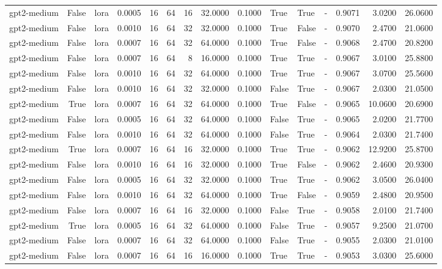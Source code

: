 \begin{tabular}{lrlrrrrrrlllrrr}
gpt2-medium & False & lora & 0.0005 & 16 & 64 & 16 & 32.0000 & 0.1000 & True & True & - & 0.9071 & 3.0200 & 26.0600 \\
gpt2-medium & False & lora & 0.0010 & 16 & 64 & 32 & 32.0000 & 0.1000 & True & False & - & 0.9070 & 2.4700 & 21.0600 \\
gpt2-medium & False & lora & 0.0007 & 16 & 64 & 32 & 64.0000 & 0.1000 & True & False & - & 0.9068 & 2.4700 & 20.8200 \\
gpt2-medium & False & lora & 0.0007 & 16 & 64 & 8 & 16.0000 & 0.1000 & True & True & - & 0.9067 & 3.0100 & 25.8800 \\
gpt2-medium & False & lora & 0.0010 & 16 & 64 & 32 & 64.0000 & 0.1000 & True & True & - & 0.9067 & 3.0700 & 25.5600 \\
gpt2-medium & False & lora & 0.0010 & 16 & 64 & 32 & 32.0000 & 0.1000 & False & True & - & 0.9067 & 2.0300 & 21.0500 \\
gpt2-medium & True & lora & 0.0007 & 16 & 64 & 32 & 64.0000 & 0.1000 & True & False & - & 0.9065 & 10.0600 & 20.6900 \\
gpt2-medium & False & lora & 0.0005 & 16 & 64 & 32 & 64.0000 & 0.1000 & False & True & - & 0.9065 & 2.0200 & 21.7700 \\
gpt2-medium & False & lora & 0.0010 & 16 & 64 & 32 & 64.0000 & 0.1000 & False & True & - & 0.9064 & 2.0300 & 21.7400 \\
gpt2-medium & True & lora & 0.0007 & 16 & 64 & 16 & 32.0000 & 0.1000 & True & True & - & 0.9062 & 12.9200 & 25.8700 \\
gpt2-medium & False & lora & 0.0010 & 16 & 64 & 16 & 32.0000 & 0.1000 & True & False & - & 0.9062 & 2.4600 & 20.9300 \\
gpt2-medium & False & lora & 0.0005 & 16 & 64 & 32 & 32.0000 & 0.1000 & True & True & - & 0.9062 & 3.0500 & 26.0400 \\
gpt2-medium & False & lora & 0.0010 & 16 & 64 & 32 & 64.0000 & 0.1000 & True & False & - & 0.9059 & 2.4800 & 20.9500 \\
gpt2-medium & False & lora & 0.0007 & 16 & 64 & 16 & 32.0000 & 0.1000 & False & True & - & 0.9058 & 2.0100 & 21.7400 \\
gpt2-medium & True & lora & 0.0005 & 16 & 64 & 32 & 64.0000 & 0.1000 & False & True & - & 0.9057 & 9.2500 & 21.0700 \\
gpt2-medium & False & lora & 0.0007 & 16 & 64 & 32 & 64.0000 & 0.1000 & False & True & - & 0.9055 & 2.0300 & 21.0100 \\
gpt2-medium & False & lora & 0.0007 & 16 & 64 & 16 & 16.0000 & 0.1000 & True & True & - & 0.9053 & 3.0300 & 25.6000 \\

\end{tabular}

